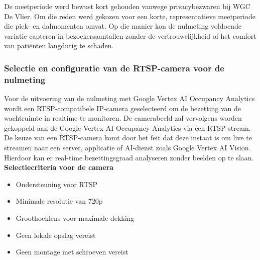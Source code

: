 De meetperiode werd bewust kort gehouden vanwege privacybezwaren bij WGC De Vlier. Om die reden werd gekozen voor een korte, representatieve meetperiode die piek- en dalmomenten omvat. Op die manier kon de nulmeting voldoende variatie capteren in bezoekersaantallen zonder de vertrouwelijkheid of het comfort van patiënten langdurig te schaden.

\subsubsection{Selectie en configuratie van de RTSP-camera voor de nulmeting}
Voor de uitvoering van de nulmeting met Google Vertex AI Occupancy Analytics wordt een RTSP-compatibele IP-camera geselecteerd om de bezetting van de wachtruimte in realtime te monitoren. De camerabeeld zal vervolgens worden gekoppeld aan de Google Vertex AI Occupancy Analytics via een RTSP-stream. \\

De keuze van een RTSP-camera komt door het feit dat deze instaat is om live te streamen naar een server, applicatie of AI-dienst zoals Google Vertex AI Vision. Hierdoor kan er real-time bezettingsgraad analyseren zonder beelden op te slaan. \\

\textbf{Selectiecriteria voor de camera}
\begin{itemize}
    \item Ondersteuning voor RTSP
    \item Minimale resolutie van 720p
    \item Groothoeklens voor maximale dekking
    \item Geen lokale opslag vereist
    \item Geen montage met schroeven vereist
\end{itemize}

